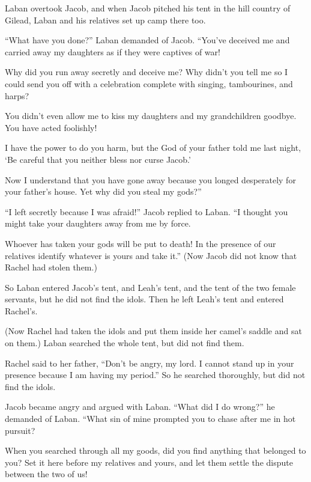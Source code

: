 \begin{scripture}
 Laban overtook Jacob, and when Jacob pitched his tent in the hill country of Gilead, Laban and his relatives set up camp there too.
 ``What have you done?'' Laban demanded of Jacob. ``You've deceived me and carried away my daughters as if they were captives of war!
 Why did you run away secretly and deceive me? Why didn't you tell me so I could send you off with a celebration complete with singing, tambourines, and harps?
 You didn't even allow me to kiss my daughters and my grandchildren goodbye. You have acted foolishly!
 I have the power to do you harm, but the God of your father told me last night, `Be careful that you neither bless nor curse Jacob.'
 Now I understand that you have gone away because you longed desperately for your father's house. Yet why did you steal my gods?''
\everypar{}

 ``I left secretly because I was afraid!'' Jacob replied to Laban. ``I thought you might take your daughters away from me by force.
 Whoever has taken your gods will be put to death! In the presence of our relatives identify whatever is yours and take it.'' (Now Jacob did not know that Rachel had stolen them.)
\everypar{}

 So Laban entered Jacob's tent, and Leah's tent, and the tent of the two female servants, but he did not find the idols. Then he left Leah's tent and entered Rachel's.
 (Now Rachel had taken the idols and put them inside her camel's saddle and sat on them.) Laban searched the whole tent, but did not find them.
 Rachel said to her father, ``Don't be angry, my lord. I cannot stand up in your presence because I am having my period.'' So he searched thoroughly, but did not find the idols.
\everypar{}

 Jacob became angry and argued with Laban. ``What did I do wrong?'' he demanded of Laban. ``What sin of mine prompted you to chase after me in hot pursuit?
 When you searched through all my goods, did you find anything that belonged to you? Set it here before my relatives and yours, and let them settle the dispute between the two of us!
\everypar{}


\end{scripture}
